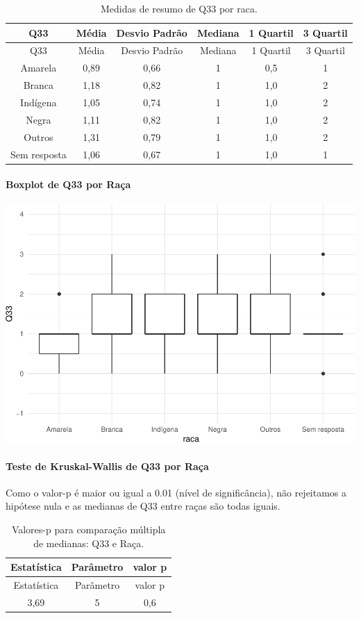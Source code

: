 \documentclass[]{article}
\let\oldparagraph\paragraph
\renewcommand{\paragraph}[1]{\oldparagraph{#1}\mbox{}}
\begin{document}
\begin{longtable}[]{@{}cccccc@{}}
\caption{\label{tab:unnamed-chunk-1168}Medidas de resumo de Q33 por raca.}\tabularnewline
\toprule
Q33 & Média & Desvio Padrão & Mediana & 1 Quartil & 3 Quartil\tabularnewline
\midrule
\endfirsthead
\toprule
Q33 & Média & Desvio Padrão & Mediana & 1 Quartil & 3 Quartil\tabularnewline
\midrule
\endhead
Amarela & 0,89 & 0,66 & 1 & 0,5 & 1\tabularnewline
Branca & 1,18 & 0,82 & 1 & 1,0 & 2\tabularnewline
Indígena & 1,05 & 0,74 & 1 & 1,0 & 2\tabularnewline
Negra & 1,11 & 0,82 & 1 & 1,0 & 2\tabularnewline
Outros & 1,31 & 0,79 & 1 & 1,0 & 2\tabularnewline
Sem resposta & 1,06 & 0,67 & 1 & 1,0 & 1\tabularnewline
\bottomrule
\end{longtable}

\hypertarget{boxplot-de-q33-por-rauxe7a}{%
\paragraph{Boxplot de Q33 por Raça}\label{boxplot-de-q33-por-rauxe7a}}

\begin{center}\includegraphics[width=0.75\linewidth]{relatorio_covid19_files/figure-latex/unnamed-chunk-1169-1} \end{center}

\hypertarget{teste-de-kruskal-wallis-de-q33-por-rauxe7a}{%
\paragraph{Teste de Kruskal-Wallis de Q33 por Raça}\label{teste-de-kruskal-wallis-de-q33-por-rauxe7a}}

Como o valor-p é maior ou igual a 0.01 (nível de significância), não rejeitamos a hipótese nula e as medianas de Q33 entre raças são todas iguais.

\begin{longtable}[]{@{}ccc@{}}
\caption{\label{tab:unnamed-chunk-1171}Valores-p para comparação múltipla de medianas: Q33 e Raça.}\tabularnewline
\toprule
Estatística & Parâmetro & valor p\tabularnewline
\midrule
\endfirsthead
\toprule
Estatística & Parâmetro & valor p\tabularnewline
\midrule
\endhead
3,69 & 5 & 0,6\tabularnewline
\bottomrule
\end{longtable}
\end{document}
